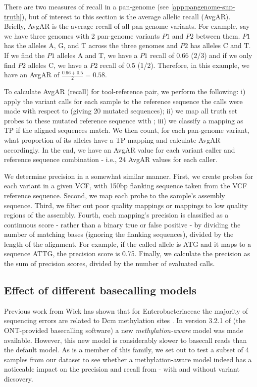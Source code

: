 There are two measures of recall in a pan-genome (see \autoref{app:pangenome-snp-truth}), but of interest to this section is the average allelic recall (AvgAR). Briefly, AvgAR  is the average recall of all pan-genome variants. For example, say we have three genomes with 2 pan-genome variants $P1$ and $P2$ between them. $P1$ has the alleles A, G, and T across the three genomes and $P2$ has alleles C and T. If we find the $P1$ alleles A and T, we have a $P1$ recall of 0.66 (2/3) and if we only find $P2$ alleles C, we have a $P2$ recall of 0.5 (1/2). Therefore, in this example, we have an AvgAR of $\frac{0.66+0.5}{2}=0.58$.

To calculate AvgAR (recall) for tool-reference pair, we perform the following: i) apply the variant calls for each sample to the reference sequence the calls were made with respect to (giving 20 mutated sequences); ii) we map all truth set probes to these mutated reference sequence with ; iii) we classify a mapping as TP if the aligned sequences match. We then count, for each pan-genome variant, what proportion of its alleles have a TP mapping and calculate AvgAR accordingly. In the end, we have an AvgAR value for each variant caller and reference sequence combination - i.e., 24 AvgAR values for each caller.

We determine precision in a somewhat similar manner. First, we create probes for each variant in a given VCF, with 150bp flanking sequence taken from the VCF reference sequence. Second, we map each probe to the sample's assembly sequence. Third, we filter out poor quality mappings or mappings to low quality regions of the assembly. Fourth, each mapping's precision is classified as a continuous score - rather than a binary true or false positive - by dividing the number of matching bases (ignoring the flanking sequences), divided by the length of the alignment. For example, if the called allele is ATG and it maps to a sequence ATTG, the precision score is 0.75. Finally, we calculate the precision as the sum of precision scores, divided by the number of evaluated calls.

\subsection{Effect of different \ont{} basecalling models}
\label{sec:denovo-methylation}

Previous work from Wick \etal{} has shown that for Enterobacteriaceae the majority of \ont{} sequencing errors are related to Dcm methylation sites \cite{wick2019}. In version 3.2.1 of \guppy{} (the ONT-provided basecalling software) a new \emph{methylation-aware} model was made available. However, this new model is considerably slower to basecall reads than the default model. As \ecoli{} is a member of this family, we set out to test a subset of 4 samples from our dataset to see whether a methylation-aware model indeed has a noticeable impact on the precision and recall from \pandora{} - with and without \denovo{} variant dicsovery.

